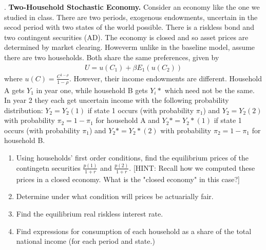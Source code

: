 \documentclass[11pt]{SelfArxOneColBMN}
\begin{document}
. \textbf{Two-Household Stochastic Economy.} Consider an economy like the one we studied in class. There are two periods, exogenous endowments, uncertain in the secod period with two states of the world possible. There is a riskless bond and two contingent securities (AD). The economy is closed and so asset prices are determined by market clearing. Howeverm unlike in the baseline model, assume there are two households. Both share the same preferences, given by
\begin{eqnarray*}
  U = u(C_1) + \beta E_1(u(C_2))
\end{eqnarray*}
where $u(C) = \frac{C^{1 - \rho}}{1 - \rho}$. However, their income endowments are different. Household A gets $Y_1$ in year one, while household B gets $Y_i*$ which need not be the same. In year 2 they each get uncertain income with the following probability distribution: $Y_2 = Y_2(1)$ if state 1 occurs (with probability $\pi_1$) and $Y_2 = Y_2(2)$ with probability $\pi_2 = 1 - \pi_1$ for household A and $Y_2* = Y_2*(1)$ if state 1 occurs (with probability $\pi_1$) and $Y_2* = Y_2*(2)$ with probability $\pi_2 = 1 - \pi_1$ for household B.
\begin{enumerate}
  \item Using households' first order conditions, find the equilibrium prices of the contingetn securities $\frac{p(1)}{1 + r}$ and $\frac{p(2)}{1 + r}$. [HINT: Recall how we computed these prices in a closed economy. What is the "closed economy" in this case?]
  \item Determine under what condition will prices be actuarially fair.
  \item Find the equilibrium real riskless interest rate.
  \item Find expressions for consumption of each household as a share of the total national income (for each period and state.)
\end{enumerate}

\end{document}
